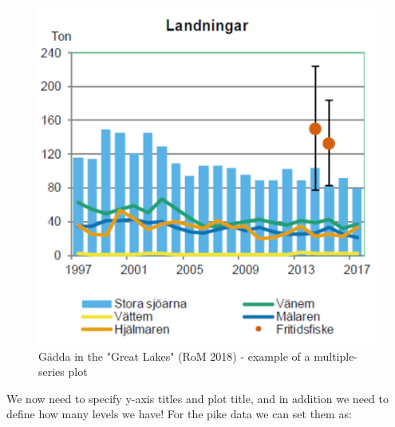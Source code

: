 \documentclass[]{article}
\newenvironment{Shaded}{\begin{snugshade}}{\end{snugshade}}
\newcommand{\KeywordTok}[1]{\textcolor[rgb]{0.13,0.29,0.53}{\textbf{#1}}}
\newcommand{\StringTok}[1]{\textcolor[rgb]{0.31,0.60,0.02}{#1}}
\newcommand{\OperatorTok}[1]{\textcolor[rgb]{0.81,0.36,0.00}{\textbf{#1}}}
\newcommand{\NormalTok}[1]{#1}
\begin{document}
\begin{figure}

{\centering \includegraphics{gadda} 

}

\caption{Gädda in the "Great Lakes" (RoM 2018) - example of a multiple-series plot}\label{fig:plot gadda}
\end{figure}

We now need to specify y-axis titles and plot title, and in addition we
need to define how many levels we have! For the pike data we can set
them as:

\begin{Shaded}
\end{Shaded}
\end{document}
